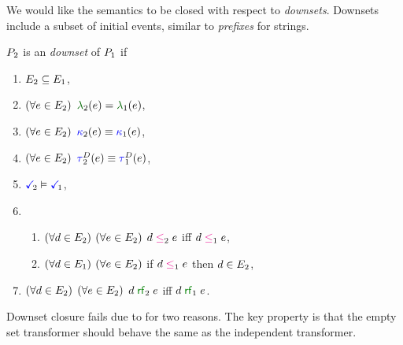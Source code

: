 
We would like the semantics to be closed with respect to \emph{downsets}.
Downsets include a subset of initial events, similar to \emph{prefixes} for
strings.
\begin{definition}
  \label{def:downset}
  $P_2$ is an \emph{downset} of $P_1$ if
  \begin{multicols}{2}
    \begin{enumerate}
    \item $E_2\subseteq E_1$,
    \item $(\forall e\in E_2)$ $\labelingAct_2(\aEv)=\labelingAct_1(\aEv)$,
    \item $(\forall e\in E_2)$ ${\color{blue}\kappa}_2(e)\mathrel{\equiv}{\color{blue}\kappa}_1(e)$,
    \item $(\forall e\in E_2)$ $\aTr[2]{\bEvs}{\aEv}\riff\aTr[1]{\bEvs}{\aEv}$,
    \item $\aTerm[2] \rimplies \aTerm[1]$,
    \item[] 
      \begin{enumerate}[leftmargin=0pt]
      \item $(\forall d\in E_2)$ $(\forall e\in E_2)$ $\bEv\le_2\aEv$ iff $\bEv\le_1\aEv$,
      \item $(\forall d\in E_1)$ $(\forall e\in E_2)$ if
        $\bEv\le_1\aEv$ then $d\in E_2$,
      \end{enumerate}
    \item $(\forall d\in E_2)$ $(\forall e\in E_2)$ $\bEv\rrfx_2\aEv$ iff $\bEv\rrfx_1\aEv$.
    \end{enumerate}
  \end{multicols}
\end{definition}

Downset closure fails due to for two reasons.  The key property is that the
empty set transformer should behave the same as the independent transformer.

